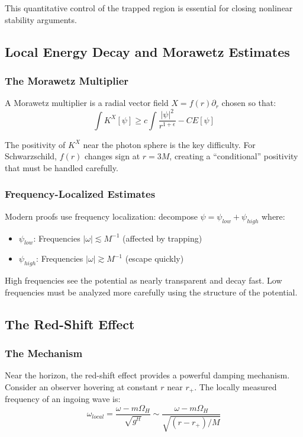 \documentclass[12pt,a4paper]{article}
\begin{document}
This quantitative control of the trapped region is essential for closing nonlinear stability arguments.

\subsection{Local Energy Decay and Morawetz Estimates}

\subsubsection{The Morawetz Multiplier}

A Morawetz multiplier is a radial vector field $X = f(r)\partial_r$ chosen so that:
\begin{equation}
\int K^X[\psi] \geq c \int \frac{|\psi|^2}{r^{1+\epsilon}} - C E[\psi]
\end{equation}

The positivity of $K^X$ near the photon sphere is the key difficulty. For Schwarzschild, $f(r)$ changes sign at $r = 3M$, creating a ``conditional'' positivity that must be handled carefully.

\subsubsection{Frequency-Localized Estimates}

Modern proofs use frequency localization: decompose $\psi = \psi_{low} + \psi_{high}$ where:
\begin{itemize}
    \item $\psi_{low}$: Frequencies $|\omega| \lesssim M^{-1}$ (affected by trapping)
    \item $\psi_{high}$: Frequencies $|\omega| \gtrsim M^{-1}$ (escape quickly)
\end{itemize}

High frequencies see the potential as nearly transparent and decay fast. Low frequencies must be analyzed more carefully using the structure of the potential.

\subsection{The Red-Shift Effect}

\subsubsection{The Mechanism}

Near the horizon, the red-shift effect provides a powerful damping mechanism. Consider an observer hovering at constant $r$ near $r_+$. The locally measured frequency of an ingoing wave is:
\begin{equation}
\omega_{local} = \frac{\omega - m\Omega_H}{\sqrt{g^{tt}}} \sim \frac{\omega - m\Omega_H}{\sqrt{(r-r_+)/M}}
\end{equation}
\end{document}
